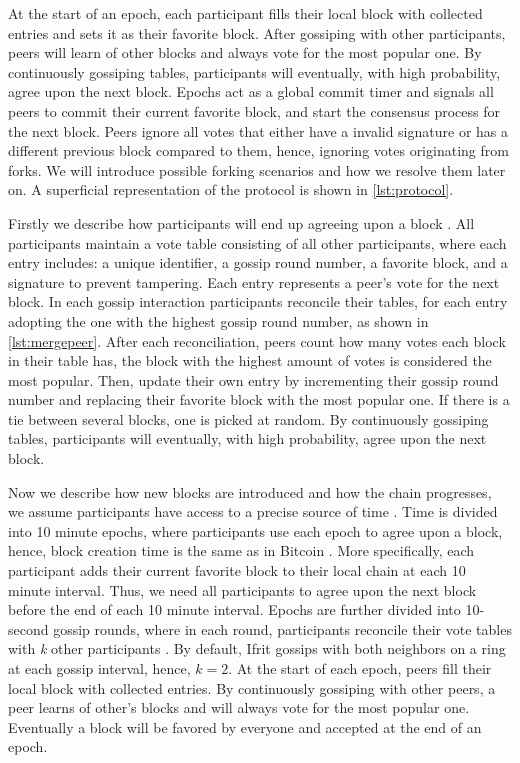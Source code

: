\documentclass[USenglish]{uit-thesis}
\begin{document}
At the start of an epoch, each participant fills their local block with collected entries and sets it as their favorite block.
After gossiping with other participants, peers will learn of other blocks and always vote for the most popular one.
By continuously gossiping tables, participants will eventually, with high probability, agree upon the next block.
Epochs act as a global commit timer and signals all peers to commit their current favorite block, and start the consensus process for the next block.
Peers ignore all votes that either have a invalid signature or has a different previous block compared to them, hence, ignoring votes originating from forks.
We will introduce possible forking scenarios and how we resolve them later on.
A superficial representation of the protocol is shown in \autoref{lst:protocol}.
\begin{code}
\end{code} 






\iffalse
Firstly we describe how participants will end up agreeing upon a block \cite{vanblock}.
All participants maintain a vote table consisting of all other participants, where each entry includes: a unique identifier, a gossip round number, a favorite block, and a signature to prevent tampering.
Each entry represents a peer's vote for the next block.
In each gossip interaction participants reconcile their tables, for each entry adopting the one with the highest gossip round number, as shown in \autoref{lst:mergepeer}.
After each reconciliation, peers count how many votes each block in their table has, the block with the highest amount of votes is considered the most popular.  
Then, update their own entry by incrementing their gossip round number and replacing their favorite block with the most popular one. 
If there is a tie between several blocks, one is picked at random.
By continuously gossiping tables, participants will eventually, with high probability, agree upon the next block.


Now we describe how new blocks are introduced and how the chain progresses, we assume participants have access to a precise source of time \cite{vanblock}.
Time is divided into 10 minute epochs, where participants use each epoch to agree upon a block, hence, block creation time is the same as in Bitcoin \cite{bitcoin}.
More specifically, each participant adds their current favorite block to their local chain at each 10 minute interval.
Thus, we need all participants to agree upon the next block before the end of each 10 minute interval.
Epochs are further divided into 10-second gossip rounds, where in each round, participants reconcile their vote tables with \textit{k} other participants \cite{vanblock}.
By default, Ifrit gossips with both neighbors on a ring at each gossip interval, hence, $k = 2$.
At the start of each epoch, peers fill their local block with collected entries.
By continuously gossiping with other peers, a peer learns of other's blocks and will always vote for the most popular one.
Eventually a block will be favored by everyone and accepted at the end of an epoch.
\end{document}
